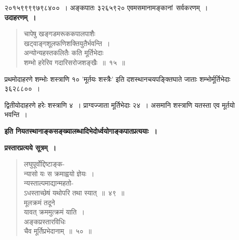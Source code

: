 \documentclass[11pt, openany]{book}
\begin{document}
\newpage

\noindent २०१५९९९९७९८४००~। अङ्कपातः ३२६५९२० एवमसमानामङ्कानां\ सर्वकरणम्~। \\

\textbf{उदाहरणम्~।} 

\begin{quote}
{\ex चापेषु खङ्गडमरूककपालपाशैः\\
खट्वाङ्गशूलफणिशक्तियुतैर्भवन्ति~।\\
अन्योन्यहस्तकलितैः कति मूर्तिभेदाः\\
शम्भो हरेरिव गदारिसरोजशङ्खैः~॥~१५~॥	}
\end{quote}

प्रथमोदाहरणे शम्भोः शस्त्राणि १० 'मूर्तयः शस्त्रैः' इति दशस्थानचयपङ्क्तिघाते जाताः शम्भोर्मूर्तिभेदाः ३६२८८००~।
\vspace{2mm}

द्वितीयोदाहरणे हरेः शस्त्राणि ४~। प्राग्वज्जाता मूर्तिभेदाः २४~। असमानि शस्त्राणि यतस्ता एव मूर्तयो भवन्ति~।

\begin{center}
\textbf{इति नियतस्थानाङ्कसङ्ख्यालब्धादिभेदोर्ध्वयोगाङ्कपातप्रत्ययाः~।}
\end{center}
\vspace{2mm}

\textbf{प्रस्तारप्रत्यये सूत्रम्~।}

 \label{13.49}
\begin{quote}
{\gk लघुपूर्वोद्दिष्टाङ्क- \\
न्यासो यः स क्रमाह्वयो ज्ञेयः~।\\
न्यस्ताल्पमाद्यान्महतो-\\
ऽधस्ताच्छेषं यथोपरि तथा स्यात्~॥~४९~॥\\
मूलक्रमं तदूने\\
यावत् क्रममुत्क्रमं याति~।\\
अङ्कप्रस्तारविधिः\\
चैव मूर्तिप्रभेदानाम्~॥~५०~॥}
\end{quote}

\newpage
\end{document}
